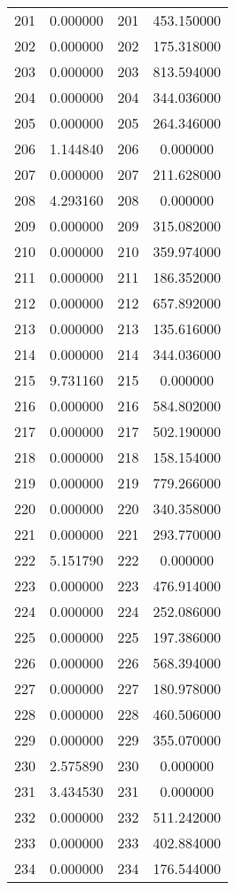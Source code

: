 \documentclass[12pt]{article}
\begin{document}
\begin{longtable}{@{}cccc@{}}
201 & 0.000000 & 201 & 453.150000 \\
202 & 0.000000 & 202 & 175.318000 \\
203 & 0.000000 & 203 & 813.594000 \\
204 & 0.000000 & 204 & 344.036000 \\
205 & 0.000000 & 205 & 264.346000 \\
206 & 1.144840 & 206 & 0.000000 \\
207 & 0.000000 & 207 & 211.628000 \\
208 & 4.293160 & 208 & 0.000000 \\
209 & 0.000000 & 209 & 315.082000 \\
210 & 0.000000 & 210 & 359.974000 \\
211 & 0.000000 & 211 & 186.352000 \\
212 & 0.000000 & 212 & 657.892000 \\
213 & 0.000000 & 213 & 135.616000 \\
214 & 0.000000 & 214 & 344.036000 \\
215 & 9.731160 & 215 & 0.000000 \\
216 & 0.000000 & 216 & 584.802000 \\
217 & 0.000000 & 217 & 502.190000 \\
218 & 0.000000 & 218 & 158.154000 \\
219 & 0.000000 & 219 & 779.266000 \\
220 & 0.000000 & 220 & 340.358000 \\
221 & 0.000000 & 221 & 293.770000 \\
222 & 5.151790 & 222 & 0.000000 \\
223 & 0.000000 & 223 & 476.914000 \\
224 & 0.000000 & 224 & 252.086000 \\
225 & 0.000000 & 225 & 197.386000 \\
226 & 0.000000 & 226 & 568.394000 \\
227 & 0.000000 & 227 & 180.978000 \\
228 & 0.000000 & 228 & 460.506000 \\
229 & 0.000000 & 229 & 355.070000 \\
230 & 2.575890 & 230 & 0.000000 \\
231 & 3.434530 & 231 & 0.000000 \\
232 & 0.000000 & 232 & 511.242000 \\
233 & 0.000000 & 233 & 402.884000 \\
234 & 0.000000 & 234 & 176.544000 \\

\end{longtable}
\end{document}
